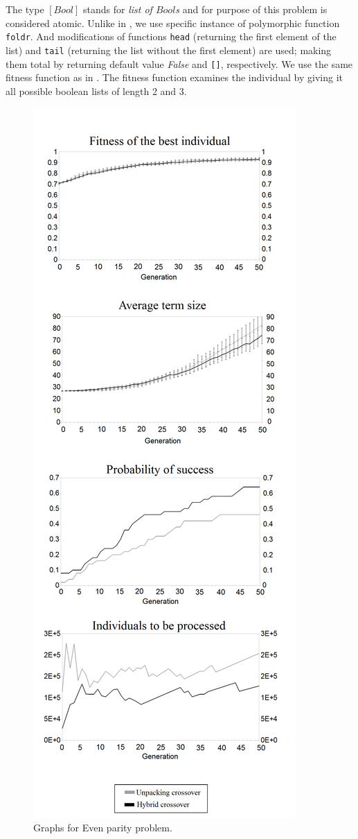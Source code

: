 \documentclass{sig-alternate}
\begin{document}
The type $[Bool]$ stands for \textit{list of $Bool$s} and for purpose of
this problem is considered atomic.
Unlike in \cite{yu01}, we use specific instance of polymorphic 
function \texttt{foldr}. 
And modifications of functions \texttt{head} 
(returning the first element of the list) 
and \texttt{tail} (returning the list without the first element) are used; 
making them total by returning default value \textit{False}
and \texttt{[]}, respectively.
We use the same fitness function as in \cite{yu01}. 
The fitness function examines the individual by giving
it all possible boolean lists of length 2 and 3.

\begin{figure}[!ht]
  \centering
  \caption{Graphs for Even parity problem.}
  \includegraphics[scale=0.2]{grafy/EP.PNG} %
\end{figure}
\end{document}
